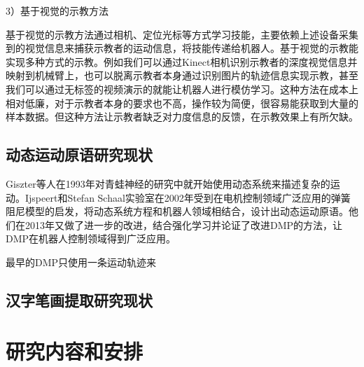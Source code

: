 3）基于视觉的示教方法

基于视觉的示教方法通过相机、定位光标等方式学习技能，主要依赖上述设备采集到的视觉信息来捕获示教者的运动信息，将技能传递给机器人。基于视觉的示教能实现多种方式的示教。例如我们可以通过Kinect相机识别示教者的深度视觉信息并映射到机械臂上\cite{Xu2018b}，也可以脱离示教者本身通过识别图片的轨迹信息实现示教\cite{Li2021}，甚至我们可以通过无标签的视频演示的就能让机器人进行模仿学习\cite{Sermanet2018}。这种方法在成本上相对低廉，对于示教者本身的要求也不高，操作较为简便，很容易能获取到大量的样本数据。但这种方法让示教者缺乏对力度信息的反馈，在示教效果上有所欠缺。

\subsection{动态运动原语研究现状}
Giszter等人在1993年对青蛙神经的研究中就开始使用动态系统来描述复杂的运动\cite{Giszter1993b}。Ijspeert和Stefan Schaal实验室在2002年受到在电机控制领域广泛应用的弹簧阻尼模型的启发，将动态系统方程和机器人领域相结合，设计出动态运动原语\cite{Ijspeert2002}。他们在2013年又做了进一步的改进，结合强化学习并论证了改进DMP的方法，让DMP在机器人控制领域得到广泛应用\cite{Ijspeert2013}。

最早的DMP只使用一条运动轨迹来





\subsection{汉字笔画提取研究现状}

\section{研究内容和安排}


